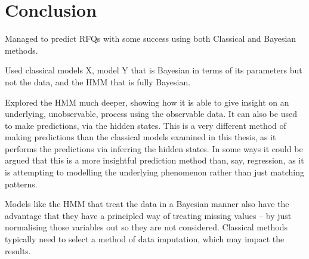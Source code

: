 \chapter{Conclusion}

Managed to predict RFQs with some success using both Classical and Bayesian methods.

Used classical models X, model Y that is Bayesian in terms of its parameters but not the data, and the HMM that is fully Bayesian.

Explored the HMM much deeper, showing how it is able to give insight on an underlying, unobservable, process using the observable data. It can also be used to make predictions, via the hidden states. This is a very different method of making predictions than the classical models examined in this thesis, as it performs the predictions via inferring the hidden states. In some ways it could be argued that this is a more insightful prediction method than, say, regression, as it is attempting to modelling the underlying phenomenon rather than just matching patterns.

Models like the HMM that treat the data in a Bayesian manner also have the advantage that they have a principled way of treating missing values -- by just normalising those variables out so they are not considered. Classical methods typically need to select a method of data imputation, which may impact the results.
